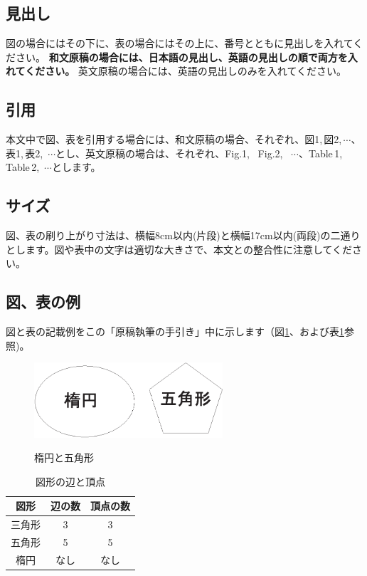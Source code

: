 \documentclass{hissymp}
\begin{document}
\subsection{見出し}
図の場合にはその下に、表の場合にはその上に、番号とともに見出しを入れてください。
{\bf 和文原稿の場合には、日本語の見出し、英語の見出しの順で両方を入れてください。} 
英文原稿の場合には、英語の見出しのみを入れてください。

\subsection{引用}
本文中で図、表を引用する場合には、和文原稿の場合、それぞれ、図1,\,図2,\,$ \cdots $、表1,\,表2,\, $ \cdots $とし、英文原稿の場合は、それぞれ、Fig.1, \, Fig.2, \, $ \cdots $、Table\,1,\,Table\,2,\, $ \cdots $とします。

\subsection{サイズ}
図、表の刷り上がり寸法は、横幅8cm以内(片段)と横幅17cm以内(両段)の二通りとします。図や表中の文字は適切な大きさで、本文との整合性に注意してください。

\subsection{図、表の例}
図と表の記載例をこの「原稿執筆の手引き」中に示します（図\ref{fig:example1}、および表\ref{table:example2}参照)。

\begin{figure}[tb]
	\begin{center}
    \includegraphics[width=70mm]{fig1.eps}
	\caption{楕円と五角形}		%
	\label{fig:example1}
	\end{center}
\end{figure}

\begin{table}[t]
	\begin{center}
	\caption{図形の辺と頂点}		%
	\label{table:example2}
	\begin{tabular}[hbt]{c c c}
	\hline
	\bf 図形 & \bf 辺の数 & \bf 頂点の数\\
	\hline
	三角形 & 3 & 3\\
	五角形 & 5 & 5\\
	楕円 & なし & なし\\
	\hline
	\end{tabular}
	\end{center}
\end{table}
\end{document}
